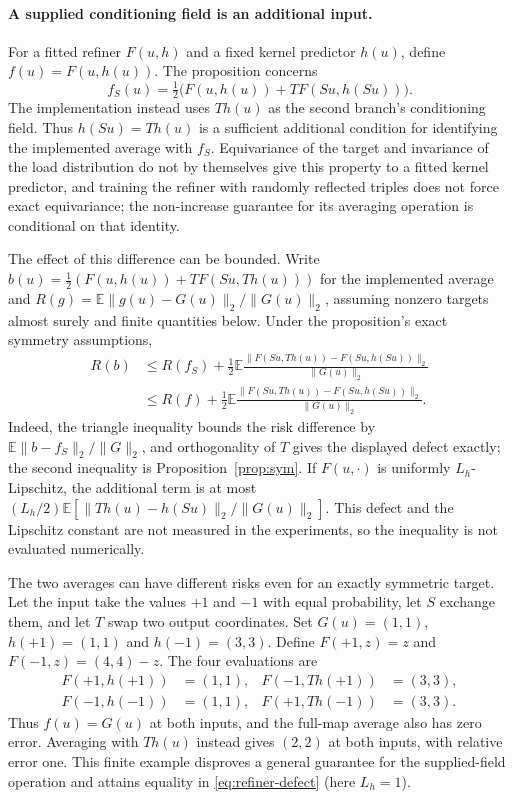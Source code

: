 \paragraph{A supplied conditioning field is an additional input.}
For a fitted refiner $F(u,h)$ and a fixed kernel predictor $h(u)$, define
$f(u)=F(u,h(u))$. The proposition concerns
\[
f_S(u)=\tfrac12\big(F(u,h(u))+T F(Su,h(Su))\big).
\]
The implementation instead uses $T h(u)$ as the second branch's conditioning
field. Thus $h(Su)=T h(u)$ is a sufficient additional condition for identifying
the implemented average with $f_S$. Equivariance of the target and invariance
of the load distribution do not by themselves give this property to a fitted
kernel predictor, and training the refiner with randomly reflected triples
does not force exact equivariance; the non-increase guarantee for its
averaging operation is conditional on that identity.

The effect of this difference can be bounded. Write
$b(u)=\tfrac12(F(u,h(u))+T F(Su,T h(u)))$ for the implemented average and
$R(g)=\mathbb E\|g(u)-G(u)\|_2/\|G(u)\|_2$, assuming nonzero targets
almost surely and finite quantities below. Under the proposition's exact
symmetry assumptions,
\begin{equation}\label{eq:refiner-defect}
\begin{aligned}
R(b)&\le R(f_S)+\frac12\mathbb E
\frac{\|F(Su,T h(u))-F(Su,h(Su))\|_2}{\|G(u)\|_2}
\\
&\le R(f)+\frac12\mathbb E
\frac{\|F(Su,T h(u))-F(Su,h(Su))\|_2}{\|G(u)\|_2}.
\end{aligned}
\end{equation}
Indeed, the triangle inequality bounds the risk difference by
$\mathbb E\|b-f_S\|_2/\|G\|_2$, and orthogonality of $T$ gives the
displayed defect exactly; the second inequality is Proposition~\ref{prop:sym}.
If $F(u,\cdot)$ is uniformly $L_h$-Lipschitz, the additional term is at most
$(L_h/2)\mathbb E[\|T h(u)-h(Su)\|_2/\|G(u)\|_2]$.
This defect and the Lipschitz constant are not measured in the experiments,
so the inequality is not evaluated numerically.

The two averages can have different risks even for an exactly symmetric target. Let the
input take the values $+1$ and $-1$ with equal probability, let $S$ exchange
them, and let $T$ swap two output coordinates. Set $G(u)=(1,1)$,
$h(+1)=(1,1)$ and $h(-1)=(3,3)$. Define $F(+1,z)=z$ and
$F(-1,z)=(4,4)-z$. The four evaluations are
\[
\begin{aligned}
F(+1,h(+1))&=(1,1), & F(-1,T h(+1))&=(3,3),\\
F(-1,h(-1))&=(1,1), & F(+1,T h(-1))&=(3,3).
\end{aligned}
\]
Thus $f(u)=G(u)$ at both inputs, and the full-map average
also has zero error. Averaging with $T h(u)$ instead gives $(2,2)$ at both
inputs, with relative error one. This finite example disproves a general
guarantee for the supplied-field operation and attains equality in
\eqref{eq:refiner-defect} (here $L_h=1$).

